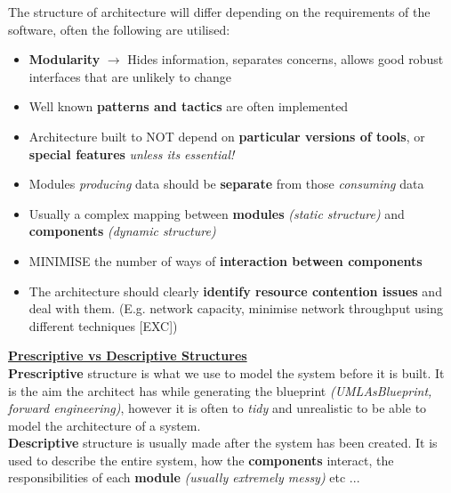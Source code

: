 \documentclass[a4paper]{report}
\begin{document}
The structure of architecture will differ depending on the requirements of the software, often the following are utilised:
\begin{itemize}
\item \textbf{Modularity} $\rightarrow$ Hides information, separates concerns, allows good robust interfaces that are unlikely to change
\item Well known \textbf{patterns and tactics} are often implemented
\item Architecture built to NOT depend on \textbf{particular versions of tools}, or \textbf{special features} \textit{unless its essential!}
\item Modules \textit{producing} data should be \textbf{separate} from those \textit{consuming} data
\item Usually a complex mapping between \textbf{modules} \textit{(static structure)} and \textbf{components} \textit{(dynamic structure)}
\item MINIMISE the number of ways of \textbf{interaction between components}
\item The architecture should clearly \textbf{identify resource contention issues} and deal with them. (E.g. network capacity, minimise network throughput using different techniques [EXC])\\
\end{itemize}

\underline{\textbf{Prescriptive vs Descriptive Structures}}\\
\textbf{Prescriptive} structure is what we use to model the system before it is built. It is the aim the architect has while generating the blueprint \textit{(UMLAsBlueprint, forward engineering)}, however it is often to \textit{tidy} and unrealistic to be able to model the architecture of a system.\\

\textbf{Descriptive} structure is usually made after the system has been created. It is used to describe the entire system, how the \textbf{components} interact, the responsibilities of each \textbf{module} \textit{(usually extremely messy)} etc ...
\end{document}
